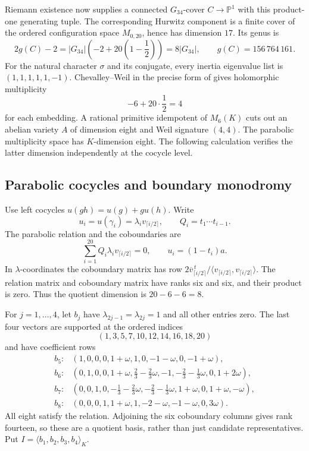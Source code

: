\documentclass[11pt]{article}
\theoremstyle{definition}
\theoremstyle{remark}
\begin{document}
Riemann existence now supplies a connected \(G_{34}\)-cover
\(C\to\mathbb P^1\) with this product-one generating tuple.  The corresponding
Hurwitz component is a finite cover of the ordered configuration space
\(M_{0,20}\), hence has dimension \(17\).  Its genus is
\[
 2g(C)-2=|G_{34}|\left(-2+20\left(1-\frac12\right)\right)
        =8|G_{34}|,
 \qquad g(C)=156\,764\,161.
\]
For the natural character \(\sigma\) and its conjugate, every inertia
eigenvalue list is \((1,1,1,1,1,-1)\).  Chevalley--Weil in the precise form
of \cite[Theorem~2.10, arXiv version p.~8]{FredianiGhigiPenegini15} gives holomorphic multiplicity
\[
                         -6+20\cdot\frac12=4
\]
for each embedding.  A rational primitive idempotent of \(M_6(K)\) cuts out
an abelian variety \(A\) of dimension eight and Weil signature \((4,4)\).
The parabolic multiplicity space has \(K\)-dimension eight.  The following
calculation verifies the latter dimension independently at the cocycle level.

\subsection{Parabolic cocycles and boundary monodromy}

Use left cocycles \(u(gh)=u(g)+g u(h)\).  Write
\[
 u_i=u(\gamma_i)=\lambda_i v_{\lceil i/2\rceil},\qquad
 Q_i=t_1\cdots t_{i-1}.
\]
The parabolic relation and the coboundaries are
\[
 \sum_{i=1}^{20}Q_i\lambda_i v_{\lceil i/2\rceil}=0,
 \qquad u_i=(1-t_i)a.
\]
In \(\lambda\)-coordinates the coboundary matrix has row
\(2\overline v_{\lceil i/2\rceil}^{\,t}/
\langle v_{\lceil i/2\rceil},v_{\lceil i/2\rceil}\rangle\).
The relation matrix and coboundary matrix have ranks six and six, and their
product is zero.  Thus the quotient dimension is \(20-6-6=8\).

For \(j=1,\ldots,4\), let \(b_j\) have
\(\lambda_{2j-1}=\lambda_{2j}=1\) and all other entries zero.  The last four
vectors are supported at the ordered indices
\[
                       (1,3,5,7,10,12,14,16,18,20)
\]
and have coefficient rows
\[
\begin{aligned}
 b_5:&(1,0,0,0,1+\omega,1,0,-1-\omega,0,-1+\omega),\\
 b_6:&(0,1,0,0,1+\omega,\tfrac23-\tfrac23\omega,-1,
                     -\tfrac23-\tfrac13\omega,0,1+2\omega),\\
 b_7:&(0,0,1,0,-\tfrac13-\tfrac23\omega,-\tfrac23-\tfrac13\omega,
                          1+\omega,0,1+\omega,-\omega),\\
 b_8:&(0,0,0,1,1+\omega,1,-2-\omega,-1-\omega,0,3\omega).
\end{aligned}
\]
All eight satisfy the relation.  Adjoining the six coboundary columns gives
rank fourteen, so these are a quotient basis, rather than just candidate
representatives.  Put \(I=\langle b_1,b_2,b_3,b_4\rangle_K\).
\end{document}
